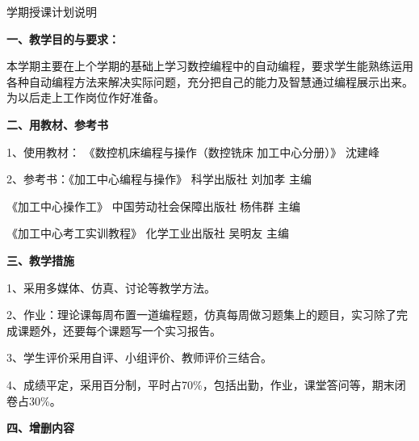 \documentclass{ctexart}
\begin{document}


\jhsy %

\begin{center}
	 \heiti 学期授课计划说明
\end{center}
 \setlength{\parindent}{2em} \setlength{\baselineskip}{22pt}

\textbf{一、教学目的与要求：}

本学期主要在上个学期的基础上学习数控编程中的自动编程，要求学生能熟练运用各种自动编程方法来解决实际问题，充分把自己的能力及智慧通过编程展示出来。为以后走上工作岗位作好准备。

\textbf{二、用教材、参考书}

1、使用教材： 《数控机床编程与操作（数控铣床 加工中心分册）》 沈建峰

2、参考书：《加工中心编程与操作》  科学出版社  刘加孝   主编

\hspace{5em}《加工中心操作工》 中国劳动社会保障出版社  杨伟群  主编

\hspace{5em}《加工中心考工实训教程》  化学工业出版社   吴明友 主编

\textbf{三、教学措施}

1、采用多媒体、仿真、讨论等教学方法。

2、作业：理论课每周布置一道编程题，仿真每周做习题集上的题目，实习除了完成课题外，还要每个课题写一个实习报告。

3、学生评价采用自评、小组评价、教师评价三结合。

4、成绩平定，采用百分制，平时占70\%，包括出勤，作业，课堂答问等，期末闭卷占30\%。

\textbf{四、增删内容}
\end{document}
